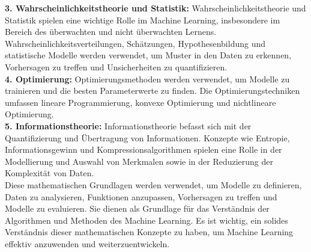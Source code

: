 \documentclass[12pt]{article}
\begin{document}
%
\textbf{3. Wahrscheinlichkeitstheorie und Statistik:} Wahrscheinlichkeitstheorie und Statistik spielen eine wichtige Rolle im Machine Learning, insbesondere im Bereich des überwachten und nicht überwachten Lernens. Wahrscheinlichkeitsverteilungen, Schätzungen, Hypothesenbildung und statistische Modelle werden verwendet, um Muster in den Daten zu erkennen, Vorhersagen zu treffen und Unsicherheiten zu quantifizieren.\\[0.2cm]
%
\textbf{4. Optimierung:} Optimierungsmethoden werden verwendet, um Modelle zu trainieren und die besten Parameterwerte zu finden. Die Optimierungstechniken umfassen lineare Programmierung, konvexe Optimierung und nichtlineare Optimierung.\\[0.2cm]
%
\textbf{5. Informationstheorie:} Informationstheorie befasst sich mit der Quantifizierung und Übertragung von Informationen. Konzepte wie Entropie, Informationsgewinn und Kompressionsalgorithmen spielen eine Rolle in der Modellierung und Auswahl von Merkmalen sowie in der Reduzierung der Komplexität von Daten.\\[0.2cm]
%
Diese mathematischen Grundlagen werden verwendet, um Modelle zu definieren, Daten zu analysieren, Funktionen anzupassen, Vorhersagen zu treffen und Modelle zu evaluieren. Sie dienen als Grundlage für das Verständnis der Algorithmen und Methoden des Machine Learning. Es ist wichtig, ein solides Verständnis dieser mathematischen Konzepte zu haben, um Machine Learning effektiv anzuwenden und weiterzuentwickeln.
%
\end{document}
